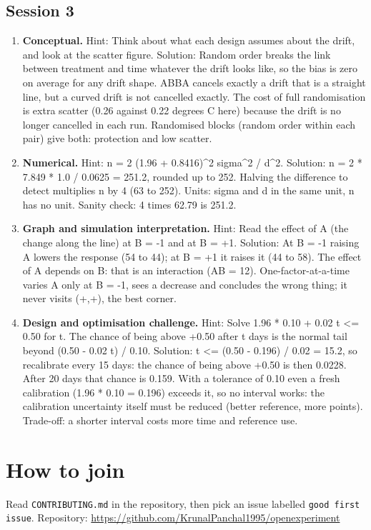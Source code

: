 \documentclass[11pt,a4paper]{article}
\begin{document}
\subsection*{Session 3}
\begin{enumerate}[nosep]
\item \textbf{Conceptual.} Hint: Think about what each design assumes about the drift, and look at the scatter figure. Solution: Random order breaks the link between treatment and time whatever the drift looks like, so the bias is zero on average for any drift shape. ABBA cancels exactly a drift that is a straight line, but a curved drift is not cancelled exactly. The cost of full randomisation is extra scatter (0.26 against 0.22 degrees C here) because the drift is no longer cancelled in each run. Randomised blocks (random order within each pair) give both: protection and low scatter.
\item \textbf{Numerical.} Hint: n = 2 (1.96 + 0.8416)\textasciicircum{}2 sigma\textasciicircum{}2 / d\textasciicircum{}2. Solution: n = 2 * 7.849 * 1.0 / 0.0625 = 251.2, rounded up to 252. Halving the difference to detect multiplies n by 4 (63 to 252). Units: sigma and d in the same unit, n has no unit. Sanity check: 4 times 62.79 is 251.2.
\item \textbf{Graph and simulation interpretation.} Hint: Read the effect of A (the change along the line) at B = -1 and at B = +1. Solution: At B = -1 raising A lowers the response (54 to 44); at B = +1 it raises it (44 to 58). The effect of A depends on B: that is an interaction (AB = 12). One-factor-at-a-time varies A only at B = -1, sees a decrease and concludes the wrong thing; it never visits (+,+), the best corner.
\item \textbf{Design and optimisation challenge.} Hint: Solve 1.96 * 0.10 + 0.02 t \textless{}= 0.50 for t. The chance of being above +0.50 after t days is the normal tail beyond (0.50 - 0.02 t) / 0.10. Solution: t \textless{}= (0.50 - 0.196) / 0.02 = 15.2, so recalibrate every 15 days: the chance of being above +0.50 is then 0.0228. After 20 days that chance is 0.159. With a tolerance of 0.10 even a fresh calibration (1.96 * 0.10 = 0.196) exceeds it, so no interval works: the calibration uncertainty itself must be reduced (better reference, more points). Trade-off: a shorter interval costs more time and reference use.
\end{enumerate}

\section{How to join}
Read \texttt{CONTRIBUTING.md} in the repository, then pick an issue labelled \texttt{good first issue}. Repository: \url{https://github.com/KrunalPanchal1995/openexperiment}
\end{document}
